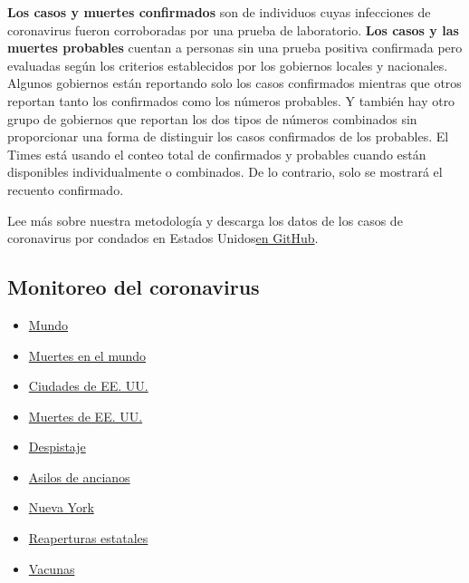 \textbf{Los casos y muertes confirmados} son de individuos cuyas
infecciones de coronavirus fueron corroboradas por una prueba de
laboratorio. \textbf{Los casos y las muertes probables} cuentan a
personas sin una prueba positiva confirmada pero evaluadas según los
criterios establecidos por los gobiernos locales y nacionales. Algunos
gobiernos están reportando solo los casos confirmados mientras que otros
reportan tanto los confirmados como los números probables. Y también hay
otro grupo de gobiernos que reportan los dos tipos de números combinados
sin proporcionar una forma de distinguir los casos confirmados de los
probables. El Times está usando el conteo total de confirmados y
probables cuando están disponibles individualmente o combinados. De lo
contrario, solo se mostrará el recuento confirmado.

Lee más sobre nuestra metodología y descarga los datos de los casos de
coronavirus por condados en Estados
Unidos\href{https://github.com/nytimes/covid-19-data}{en GitHub}.

\hypertarget{monitoreo-del-coronavirus}{%
\subsection{Monitoreo del coronavirus}\label{monitoreo-del-coronavirus}}

\begin{itemize}
\tightlist
\item
  \href{https://www.nytimes.com/interactive/2020/world/coronavirus-maps.html}{Mundo}
\item
  \href{https://www.nytimes.com/interactive/2020/04/21/world/coronavirus-missing-deaths.html}{Muertes
  en el mundo}
\item
  \href{https://www.nytimes.com/interactive/2020/04/23/upshot/five-ways-to-monitor-coronavirus-outbreak-us.html}{Ciudades
  de EE. UU.}
\item
  \href{https://www.nytimes.com/interactive/2020/05/05/us/coronavirus-death-toll-us.html}{Muertes
  de EE. UU.}
\item
  \href{https://www.nytimes.com/interactive/2020/us/coronavirus-testing.html}{Despistaje}
\item
  \href{https://www.nytimes.com/interactive/2020/us/coronavirus-nursing-homes.html}{Asilos
  de ancianos}
\item
  \href{https://www.nytimes.com/interactive/2020/nyregion/new-york-city-coronavirus-cases.html}{Nueva
  York}
\item
  \href{https://www.nytimes.com/interactive/2020/us/states-reopen-map-coronavirus.html}{Reaperturas
  estatales}
\item
  \href{https://www.nytimes.com/interactive/2020/science/coronavirus-vaccine-tracker.html}{Vacunas}
\end{itemize}

